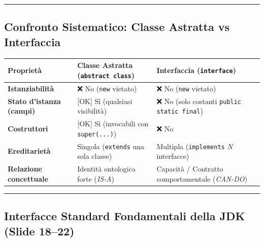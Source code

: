 \documentclass[11pt,a4paper,oneside]{report}
\newcommand{\passthrough}[1]{#1}
\begin{document}
\begin{center}\rule{0.5\linewidth}{0.5pt}\end{center}

\subsection{Confronto Sistematico: Classe Astratta vs
Interfaccia}\label{chap12_confronto-sistematico-classe-astratta-vs-interfaccia}

\begin{longtable}[]{@{}
  >{\raggedright\arraybackslash}p{}
  >{\raggedright\arraybackslash}p{}
  >{\raggedright\arraybackslash}p{}@{}}
\toprule\noalign{}
\begin{minipage}[b]{\linewidth}\raggedright
Proprietà
\end{minipage} & \begin{minipage}[b]{\linewidth}\raggedright
Classe Astratta (\passthrough{\lstinline!abstract class!})
\end{minipage} & \begin{minipage}[b]{\linewidth}\raggedright
Interfaccia (\passthrough{\lstinline!interface!})
\end{minipage} \\
\midrule\noalign{}
\endhead
\bottomrule\noalign{}
\endlastfoot
\textbf{Istanziabilità} & ❌ No (\passthrough{\lstinline!new!} vietato)
& ❌ No (\passthrough{\lstinline!new!} vietato) \\
\textbf{Stato d'istanza (campi)} & {[}OK{]} Sì (qualsiasi visibilità) &
❌ No (solo costanti \passthrough{\lstinline!public static final!}) \\
\textbf{Costruttori} & {[}OK{]} Sì (invocabili con
\passthrough{\lstinline!super(...)!}) & ❌ No \\
\textbf{Ereditarietà} & Singola (\passthrough{\lstinline!extends!} una
sola classe) & Multipla (\passthrough{\lstinline!implements!} \(N\)
interfacce) \\
\textbf{Relazione concettuale} & Identità ontologica forte (\emph{IS-A})
& Capacità / Contratto comportamentale (\emph{CAN-DO}) \\
\end{longtable}

\begin{center}\rule{0.5\linewidth}{0.5pt}\end{center}

\subsection{Interfacce Standard Fondamentali della JDK (Slide
18--22)}\label{chap12_interfacce-standard-fondamentali-della-jdk-slide-1822}
\end{document}
